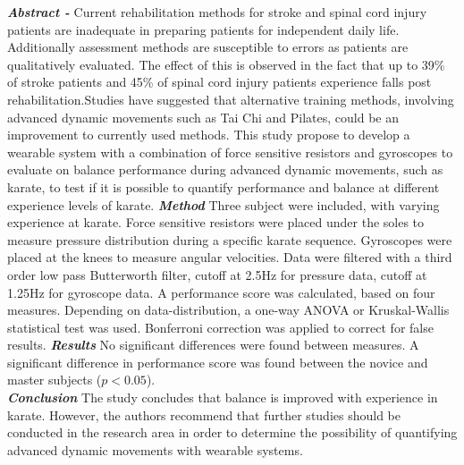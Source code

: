 \textbf{\textit{Abstract -}} Current rehabilitation methods for stroke and spinal cord injury patients are inadequate in preparing patients for independent daily life. Additionally assessment methods are susceptible to errors as patients are qualitatively evaluated. The effect of this is observed in the fact that up to 39\% of stroke patients and 45\% of spinal cord injury patients experience falls post rehabilitation.Studies have suggested that alternative training methods, involving advanced dynamic movements such as Tai Chi and Pilates, could be an improvement to currently used methods. This study propose to develop a wearable system with a combination of force sensitive resistors and gyroscopes to evaluate on balance performance during advanced dynamic movements, such as karate, to test if it is possible to quantify performance and balance at different experience levels of karate. \textbf{\textit{Method}} Three subject were included, with varying experience at karate. Force sensitive resistors were placed under the soles to measure pressure distribution during a specific karate sequence. Gyroscopes were placed at the knees to measure angular velocities. Data were filtered with a third order low pass Butterworth filter, cutoff at 2.5Hz for pressure data, cutoff at 1.25Hz for gyroscope data. A performance score was calculated, based on four measures. Depending on data-distribution, a one-way ANOVA or Kruskal-Wallis statistical test was used. Bonferroni correction was applied to correct for false results. \textbf{\textit{Results}} No significant differences were found between measures. A significant difference in performance score was found between the novice and master subjects ($p<0.05$).\\ \textbf{\textit{Conclusion}} The study concludes that balance is improved with experience in karate. However, the authors recommend that further studies should be conducted in the research area in order to determine the possibility of quantifying advanced dynamic movements with wearable systems.